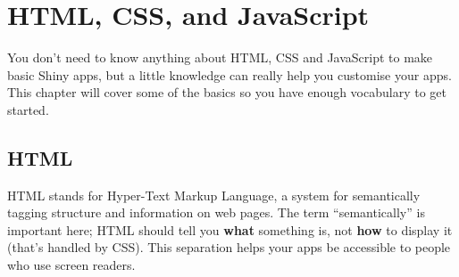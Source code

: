 \documentclass[
]{book}
\newenvironment{Shaded}{\begin{snugshade}}{\end{snugshade}}
\newcommand{\AttributeTok}[1]{\textcolor[rgb]{0.77,0.63,0.00}{#1}}
\newcommand{\ConstantTok}[1]{\textcolor[rgb]{0.00,0.00,0.00}{#1}}
\newcommand{\ControlFlowTok}[1]{\textcolor[rgb]{0.13,0.29,0.53}{\textbf{#1}}}
\newcommand{\FunctionTok}[1]{\textcolor[rgb]{0.00,0.00,0.00}{#1}}
\newcommand{\NormalTok}[1]{#1}
\newcommand{\OtherTok}[1]{\textcolor[rgb]{0.56,0.35,0.01}{#1}}
\newcommand{\SpecialCharTok}[1]{\textcolor[rgb]{0.00,0.00,0.00}{#1}}
\newcommand{\StringTok}[1]{\textcolor[rgb]{0.31,0.60,0.02}{#1}}
\begin{document}
\begin{Shaded}
\end{Shaded}

\hypertarget{web}{%
\chapter{HTML, CSS, and JavaScript}\label{web}}

You don't need to know anything about HTML, CSS and JavaScript to make basic Shiny apps, but a little knowledge can really help you customise your apps. This chapter will cover some of the basics so you have enough vocabulary to get started.

\hypertarget{html}{%
\section{HTML}\label{html}}

HTML stands for Hyper-Text Markup Language, a system for semantically tagging structure and information on web pages. The term ``semantically'' is important here; HTML should tell you \textbf{what} something is, not \textbf{how} to display it (that's handled by CSS). This separation helps your apps be accessible to people who use screen readers.
\end{document}
